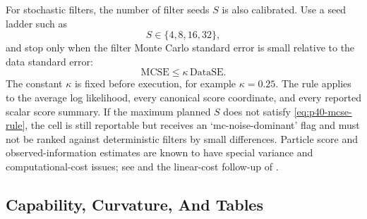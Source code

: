 \documentclass[11pt]{article}
\numberwithin{equation}{section}
\begin{document}
For stochastic filters, the number of filter seeds \(S\) is also calibrated.
Use a seed ladder such as
\begin{equation}
  S\in\{4,8,16,32\},
  \label{eq:p40-seed-ladder}
\end{equation}
and stop only when the filter Monte Carlo standard error is small relative to
the data standard error:
\begin{equation}
  \mathrm{MCSE}
  \le
  \kappa\,\mathrm{DataSE}.
  \label{eq:p40-mcse-rule}
\end{equation}
The constant \(\kappa\) is fixed before execution, for example
\(\kappa=0.25\).  The rule applies to the average log likelihood, every
canonical score coordinate, and every reported scalar score summary.  If the
maximum planned \(S\) does not satisfy \eqref{eq:p40-mcse-rule}, the cell is
still reportable but receives an `mc-noise-dominant' flag and must not be ranked
against deterministic filters by small differences.  Particle score and
observed-information estimates are known to have special variance and
computational-cost issues; see \citet{poyiadjis2011particle} and the
linear-cost follow-up of \citet{nemeth2013particle}.

\subsection{Capability, Curvature, And Tables}
\label{subsec:p40-benchmark-tables}
\end{document}

